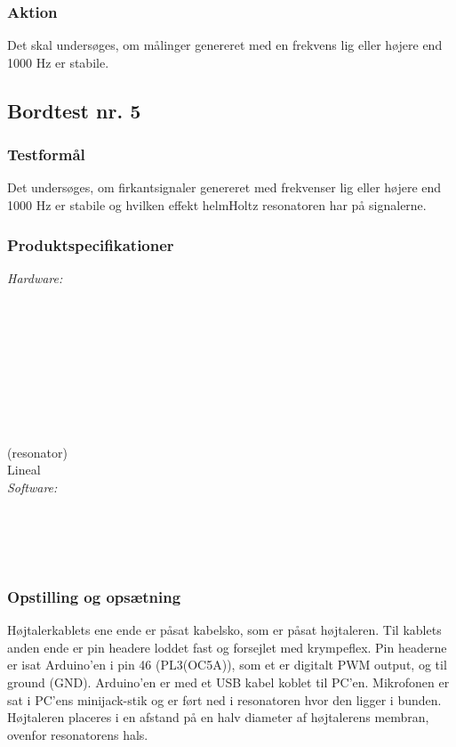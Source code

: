			\subsubsection{Aktion}
			Det skal undersøges, om målinger genereret med en frekvens lig eller højere end 1000 Hz er stabile. 
			
			\subsection{Bordtest nr. 5} %
		\subsubsection{Testformål}
		Det undersøges, om firkantsignaler genereret med frekvenser lig eller højere end 1000 Hz er stabile og hvilken effekt helmHoltz resonatoren har på signalerne. 
		
		\subsubsection{Produktspecifikationer}
		
		\textit{Hardware:}\\
		\tores\\
		\\
		\kabelsko\\
		\pins\\
		\krympeflex\\
		\arduino\\
		\mikrofon\\
		\PC\\
		\usbkabel\\
		 (resonator)\\
		Lineal\\
	
		\textit{Software:}\\
		\labview\\
		\visa\\
		\vi\\
		\ardsw\\
		
		
		\subsubsection{Opstilling og opsætning}
		
		Højtalerkablets ene ende er påsat kabelsko, som er påsat højtaleren. Til kablets anden ende er pin headere loddet fast og forsejlet med krympeflex. Pin headerne er isat Arduino'en i pin 46 (PL3(OC5A)), som et er digitalt PWM output, og til ground (GND). 
		Arduino'en er med et USB kabel koblet til PC'en.	
		Mikrofonen er sat i PC'ens minijack-stik og er ført ned i resonatoren hvor den ligger i bunden. Højtaleren placeres i en afstand på en halv diameter af højtalerens membran, ovenfor resonatorens hals. 
		
